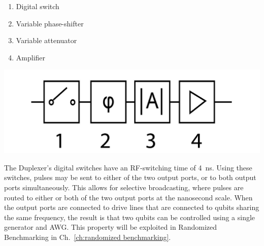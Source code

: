 

    \begin{minipage}{.5\textwidth}
        \begin{enumerate}
        \item Digital switch
        \item Variable phase-shifter
        \item Variable attenuator
        \item Amplifier
      \end{enumerate}
    \end{minipage}%
    \begin{minipage}{0.5\textwidth}
        \includegraphics[width=\textwidth]{Figures/Duplexer_properties.jpg}
    \end{minipage}

    \vspace{1cm}

      The Duplexer's digital switches have an RF-switching time of \SI{4}{\nano \second}. Using these switches, pulses may be sent to either of the two output ports, or to both output ports simultaneously. This allows for selective broadcasting, where pulses are routed to either or both of the two output ports at the nanosecond scale. When the output ports are connected to drive lines that are connected to qubits sharing the same frequency, the result is that two qubits can be controlled using a single generator and AWG. This property will be exploited in Randomized Benchmarking in Ch.~\ref{ch:randomized benchmarking}.

